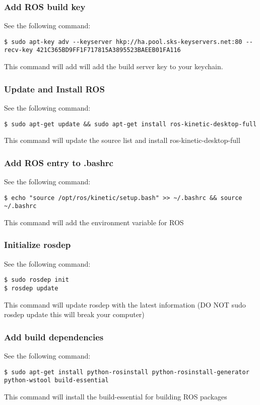 \subsubsection{Add ROS build key}
\noindent See the following command:
\begin{lstlisting}[breaklines=True language=bash]
$ sudo apt-key adv --keyserver hkp://ha.pool.sks-keyservers.net:80 --recv-key 421C365BD9FF1F717815A3895523BAEEB01FA116
\end{lstlisting}

\noindent This command will add will add the build server key to your keychain.

\subsubsection{Update and Install ROS}
\noindent See the following command:
\begin{lstlisting}[breaklines=true language=bash]
$ sudo apt-get update && sudo apt-get install ros-kinetic-desktop-full
\end{lstlisting}
\noindent This command will update the source list and install ros-kinetic-desktop-full

\subsubsection{Add ROS entry to .bashrc}
\noindent See the following command:
\begin{lstlisting}[breaklines=True language=bash]
$ echo "source /opt/ros/kinetic/setup.bash" >> ~/.bashrc && source ~/.bashrc
\end{lstlisting}
\noindent This command will add the environment variable for ROS

\subsubsection{Initialize rosdep}
\noindent See the following command:
\begin{lstlisting}[breaklines=True language=bash]
$ sudo rosdep init
$ rosdep update
\end{lstlisting}
\noindent This command will update rosdep with the latest information (DO NOT sudo rosdep update this will break your computer)

\subsubsection{Add build dependencies}
\noindent See the following command:
\begin{lstlisting}[breaklines=True language=bash]
$ sudo apt-get install python-rosinstall python-rosinstall-generator python-wstool build-essential
\end{lstlisting}
\noindent This command will install the build-essential for building ROS packages

